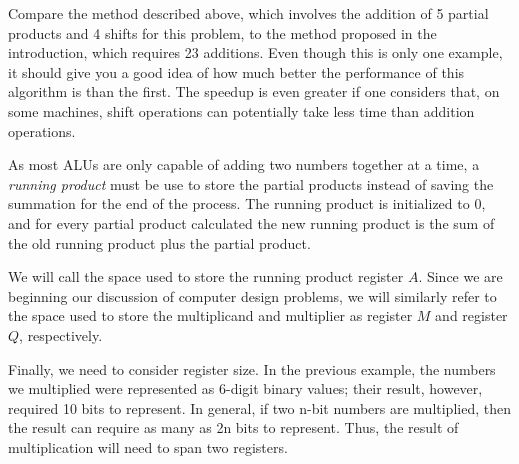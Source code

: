 \documentclass{article}
\begin{document}
Compare the method described above, which involves the addition of 5 partial products and 4 shifts for this problem, to the method proposed in the introduction, which requires 23 additions.
Even though this is only one example, it should give you a good idea of how much better the performance of this algorithm is than the first.
The speedup is even greater if one considers that, on some machines, shift operations can potentially take less time than addition operations.

As most ALUs are only capable of adding two numbers together at a time, a \emph{running product} must be use to store the partial products instead of saving the summation for the end of the process. %
The running product is initialized to 0, and for every partial product calculated the new running product is the sum of the old running product plus the partial product.

We will call the space used to store the running product register $A$.
Since we are beginning our discussion of computer design problems, we will similarly refer to the space used to store the multiplicand and multiplier as register $M$ and register $Q$, respectively.


Finally, we need to consider register size.
In the previous example, the numbers we multiplied were represented as 6-digit binary values; their result, however, required 10 bits to represent.
In general, if two n-bit numbers are multiplied, then the result can require as many as 2n bits to represent.
Thus, the result of multiplication will need to span two registers.
\end{document}
